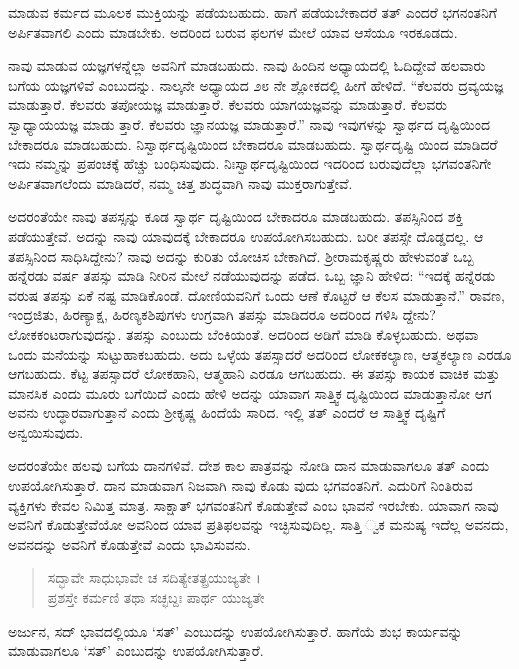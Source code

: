 ಮಾಡುವ ಕರ್ಮದ ಮೂಲಕ ಮುಕ್ತಿಯನ್ನು ಪಡೆಯಬಹುದು. ಹಾಗೆ ಪಡೆಯಬೇಕಾದರೆ ತತ್ ಎಂದರೆ ಭಗನಂತನಿಗೆ ಅರ್ಪಿತವಾಗಲಿ ಎಂದು ಮಾಡಬೇಕು. ಅದರಿಂದ ಬರುವ ಫಲಗಳ ಮೇಲೆ ಯಾವ ಆಸೆಯೂ ಇರಕೂಡದು.

ನಾವು ಮಾಡುವ ಯಜ್ಞಗಳನ್ನೆಲ್ಲಾ ಅವನಿಗೆ ಮಾಡಬಹುದು. ನಾವು ಹಿಂದಿನ ಅಧ್ಯಾಯದಲ್ಲಿ ಓದಿದ್ದೇವೆ ಹಲವಾರು ಬಗೆಯ ಯಜ್ಞಗಳಿವೆ ಎಂಬುದನ್ನು. ನಾಲ್ಕನೇ ಅಧ್ಯಾಯದ ೨೮ ನೇ ಶ್ಲೋಕದಲ್ಲಿ ಹೀಗೆ ಹೇಳಿದೆ. “ಕೆಲವರು ದ್ರವ್ಯಯಜ್ಞ ಮಾಡುತ್ತಾರೆ. ಕೆಲವರು ತಪೋಯಜ್ಞ ಮಾಡುತ್ತಾರೆ. ಕೆಲವರು ಯಾಗಯಜ್ಞವನ್ನು ಮಾಡುತ್ತಾರೆ. ಕೆಲವರು ಸ್ವಾಧ್ಯಾಯಯಜ್ಞ ಮಾಡು ತ್ತಾರೆ. ಕೆಲವರು ಜ್ಞಾನಯಜ್ಞ ಮಾಡುತ್ತಾರೆ.” ನಾವು ಇವುಗಳನ್ನು ಸ್ವಾರ್ಥದ ದೃಷ್ಟಿಯಿಂದ ಬೇಕಾದರೂ ಮಾಡಬಹುದು. ನಿಸ್ವಾರ್ಥದೃಷ್ಟಿಯಿಂದ ಬೇಕಾದರೂ ಮಾಡಬಹುದು. ಸ್ವಾರ್ಥದೃಷ್ಟಿ ಯಿಂದ ಮಾಡಿದರೆ ಇದು ನಮ್ಮನ್ನು ಪ್ರಪಂಚಕ್ಕೆ ಹೆಚ್ಚು ಬಂಧಿಸುವುದು. ನಿಃಸ್ವಾರ್ಥದೃಷ್ಟಿಯಿಂದ ಇದರಿಂದ ಬರುವುದೆಲ್ಲಾ ಭಗವಂತನಿಗೇ ಅರ್ಪಿತವಾಗಲೆಂದು ಮಾಡಿದರೆ, ನಮ್ಮ ಚಿತ್ತ ಶುದ್ಧವಾಗಿ ನಾವು ಮುಕ್ತರಾಗುತ್ತೇವೆ.

ಅದರಂತೆಯೇ ನಾವು ತಪಸ್ಸನ್ನು ಕೂಡ ಸ್ವಾರ್ಥ ದೃಷ್ಟಿಯಿಂದ ಬೇಕಾದರೂ ಮಾಡಬಹುದು. ತಪಸ್ಸಿನಿಂದ ಶಕ್ತಿ ಪಡೆಯುತ್ತೇವೆ. ಅದನ್ನು ನಾವು ಯಾವುದಕ್ಕೆ ಬೇಕಾದರೂ ಉಪಯೋಗಿಸಬಹುದು. ಬರೀ ತಪಸ್ಸೇ ದೊಡ್ಡದಲ್ಲ. ಆ ತಪಸ್ಸಿನಿಂದ ಸಾಧಿಸಿದ್ದೇನು? ನಾವು ಅದನ್ನು ಕುರಿತು ಯೋಚಿಸ ಬೇಕಾಗಿದೆ. ಶ್ರೀರಾಮಕೃಷ್ಣರು ಹೇಳುವಂತೆ ಒಬ್ಬ ಹನ್ನೆರಡು ವರ್ಷ ತಪಸ್ಸು ಮಾಡಿ ನೀರಿನ ಮೇಲೆ ನಡೆಯುವುದನ್ನು ಪಡೆದ. ಒಬ್ಬ ಜ್ಞಾನಿ ಹೇಳಿದ: “ಇದಕ್ಕೆ ಹನ್ನೆರಡು ವರುಷ ತಪಸ್ಸು ಏಕೆ ನಷ್ಟ ಮಾಡಿಕೊಂಡೆ. ದೋಣಿಯವನಿಗೆ ಒಂದು ಆಣೆ ಕೊಟ್ಟರೆ ಆ ಕೆಲಸ ಮಾಡುತ್ತಾನೆ.” ರಾವಣ, ಇಂದ್ರಜಿತು, ಹಿರಣ್ಯಾಕ್ಷ, ಹಿರಣ್ಯಕಶಿಪುಗಳು ಉಗ್ರವಾಗಿ ತಪಸ್ಸು ಮಾಡಿದರೂ ಅದರಿಂದ ಗಳಿಸಿ ದ್ದೇನು? ಲೋಕಕಂಟರಾಗುವುದನ್ನು. ತಪಸ್ಸು ಎಂಬುದು ಬೆಂಕಿಯಂತೆ. ಅದರಿಂದ ಅಡಿಗೆ ಮಾಡಿ ಕೊಳ್ಳಬಹುದು. ಅಥವಾ ಒಂದು ಮನೆಯನ್ನು ಸುಟ್ಟುಹಾಕಬಹುದು. ಅದು ಒಳ್ಳೆಯ ತಪಸ್ಸಾದರೆ ಅದರಿಂದ ಲೋಕಕಲ್ಯಾಣ, ಆತ್ಮಕಲ್ಯಾಣ ಎರಡೂ ಆಗಬಹುದು. ಕೆಟ್ಟ ತಪಸ್ಸಾದರೆ ಲೋಕಹಾನಿ, ಆತ್ಮಹಾನಿ ಎರಡೂ ಆಗಬಹುದು. ಈ ತಪಸ್ಸು ಕಾಯಕ ವಾಚಿಕ ಮತ್ತು ಮಾನಸಿಕ ಎಂದು ಮೂರು ಬಗೆಯಿದೆ ಎಂದು ಹೇಳಿ ಅದನ್ನು ಯಾವಾಗ ಸಾತ್ತ್ವಿಕ ದೃಷ್ಟಿಯಿಂದ ಮಾಡುತ್ತಾನೋ ಆಗ ಅವನು ಉದ್ಧಾರವಾಗುತ್ತಾನೆ ಎಂದು ಶ್ರೀಕೃಷ್ಣ ಹಿಂದೆಯೆ ಸಾರಿದ. ಇಲ್ಲಿ ತತ್ ಎಂದರೆ ಆ ಸಾತ್ತ್ವಿಕ ದೃಷ್ಟಿಗೆ ಅನ್ವಯಿಸುವುದು.

ಅದರಂತೆಯೇ ಹಲವು ಬಗೆಯ ದಾನಗಳಿವೆ. ದೇಶ ಕಾಲ ಪಾತ್ರವನ್ನು ನೋಡಿ ದಾನ ಮಾಡುವಾಗಲೂ ತತ್ ಎಂದು ಉಪಯೋಗಿಸುತ್ತಾರೆ. ದಾನ ಮಾಡುವಾಗ ನಿಜವಾಗಿ ನಾವು ಕೊಡು ವುದು ಭಗವಂತನಿಗೆ. ಎದುರಿಗೆ ನಿಂತಿರುವ ವ್ಯಕ್ತಿಗಳು ಕೇವಲ ನಿಮಿತ್ತ ಮಾತ್ರ. ಸಾಕ್ಷಾತ್ ಭಗವಂತನಿಗೆ ಕೊಡುತ್ತೇವೆ ಎಂಬ ಭಾವನೆ ಇರಬೇಕು. ಯಾವಾಗ ನಾವು ಅವನಿಗೆ ಕೊಡುತ್ತೇವೆಯೋ ಅವನಿಂದ ಯಾವ ಪ್ರತಿಫಲವನ್ನು ಇಚ್ಛಿಸುವುದಿಲ್ಲ. ಸಾತ್ತಿ ್ವಕ ಮನುಷ್ಯ ಇದೆಲ್ಲ ಅವನದು, ಅವನದನ್ನು ಅವನಿಗೆ ಕೊಡುತ್ತೇವೆ ಎಂದು ಭಾವಿಸುವನು.

\begin{verse}
ಸದ್ಭಾವೇ ಸಾಧುಭಾವೇ ಚ ಸದಿತ್ಯೇತತ್ಪ್ರಯುಜ್ಯತೇ ।\\ಪ್ರಶಸ್ತೇ ಕರ್ಮಣಿ ತಥಾ ಸಚ್ಛಬ್ದಃ ಪಾರ್ಥ ಯುಜ್ಯತೇ 
\end{verse}

{\small ಅರ್ಜುನ, ಸದ್ ಭಾವದಲ್ಲಿಯೂ ‘ಸತ್​’ ಎಂಬುದನ್ನು ಉಪಯೋಗಿಸುತ್ತಾರೆ. ಹಾಗೆಯೆ ಶುಭ ಕಾರ್ಯವನ್ನು ಮಾಡುವಾಗಲೂ ‘ಸತ್​’ ಎಂಬುದನ್ನು ಉಪಯೋಗಿಸುತ್ತಾರೆ.}

